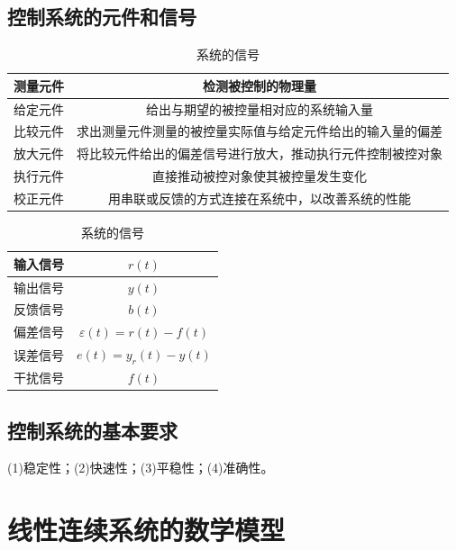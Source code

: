 \documentclass[11pt,a4paper]{ctexart}
\begin{document}
    \subsection{控制系统的元件和信号}
    \vspace{-10pt}
    \begin{table}[H]
        \centering
        \caption{}
        \begin{tabular}{|c|c|}
        \hline    
            测量元件 & 检测被控制的物理量 \\
            \hline
            给定元件 & 给出与期望的被控量相对应的系统输入量 \\
            \hline
            比较元件 & 求出测量元件测量的被控量实际值与给定元件给出的输入量的偏差 \\
            \hline
            放大元件 & 将比较元件给出的偏差信号进行放大，推动执行元件控制被控对象 \\
            \hline
            执行元件 & 直接推动被控对象使其被控量发生变化 \\ 
            \hline
            校正元件 & 用串联或反馈的方式连接在系统中，以改善系统的性能 \\
        \hline
        \end{tabular}
    
        \caption{系统的信号}
        \begin{tabular}{|c|c|}
        \hline    
            输入信号 & $r(t)$ \\
            \hline
            输出信号 & $y(t)$ \\
            \hline
            反馈信号 & $b(t)$ \\
            \hline
            偏差信号 & $\varepsilon(t)=r(t)-f(t)$ \\
            \hline
            误差信号 & $e(t)=y_r(t)-y(t)$ \\ 
            \hline
            干扰信号 & $f(t)$ \\
        \hline
        \end{tabular}
    \end{table}

    \subsection{控制系统的基本要求}
        (1)稳定性；(2)快速性；(3)平稳性；(4)准确性。  
\newpage  
\section{线性连续系统的数学模型}
\end{document}
